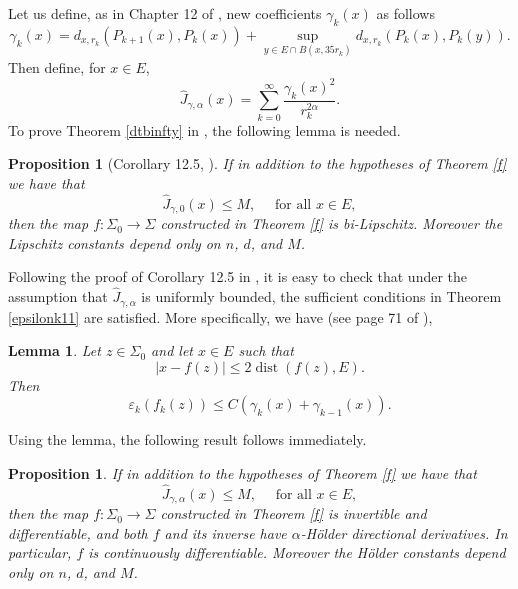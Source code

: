 \documentclass[11pt, twoside, leqno]{article}
\numberwithin{equation}{section}
\theoremstyle{plain}
\newtheorem{prop}[thm]{Proposition}
\newtheorem{lem}[thm]{Lemma}
\theoremstyle{definition}
\newcommand{\e}{\varepsilon} %
\newcommand{\dist}{\operatorname{dist}}
\begin{document}
Let us define, as in Chapter 12 of \cite{davidtoro}, new coefficients $\gamma_k(x)$ as follows
\begin{equation}
\gamma_k(x)=d_{x,r_k}(P_{k+1}(x),P_k(x)) + \sup_{y \in E \cap B(x,35r_k)}d_{x,r_k}(P_k(x), P_k(y)).
\end{equation}
Then define, for $x \in E$, 
\begin{equation}
\hat{J}_{\gamma,\alpha}(x)=\sum_{k=0}^{\infty}\frac{\gamma_k(x)^2}{r_k^{2\alpha}}.
\end{equation}
To prove Theorem \ref{dtbinfty} in \cite{davidtoro}, the following lemma is needed. 
\begin{prop} [Corollary 12.5, \cite{davidtoro}]
If in addition to the hypotheses of Theorem \ref{f} we have that 
\begin{equation}
\hat{J}_{\gamma,0}(x) \leq M, \quad \text{ for all $x \in E$},
\end{equation}
then the map $f \colon \Sigma_0 \to \Sigma$ constructed in Theorem \ref{f} is bi-Lipschitz. Moreover the Lipschitz constants depend only on $n$, $d$, and $M$.
\end{prop}
Following the proof of Corollary 12.5 in \cite{davidtoro}, it is easy to check that under the assumption that $\hat{J}_{\gamma,\alpha}$ is uniformly bounded, the sufficient conditions in Theorem \ref{epsilonk11} are satisfied.
More specifically, we have (see page 71 of \cite{davidtoro}),
\begin{lem}
Let $z \in \Sigma_0$ and let $x \in E$ such that
\begin{equation}
    |x-f(z)| \leq 2 \dist(f(z),E).
\end{equation}
Then 
\begin{equation}
    \e_k(f_k(z)) \leq C (\gamma_k(x)+\gamma_{k-1}(x)).
\end{equation}
\end{lem}
Using the lemma, the following result follows immediately.
\begin{prop}
If in addition to the hypotheses of Theorem \ref{f} we have that 
\begin{equation}
\hat{J}_{\gamma,\alpha}(x) \leq M, \quad \text{ for all $x \in E$},
\end{equation}
then the map $f \colon \Sigma_0 \to \Sigma$ constructed in Theorem \ref{f} is invertible and differentiable, and both $f$ and its inverse have $ \alpha$-H\"{o}lder directional derivatives. In particular, $f$ is continuously differentiable. Moreover the H\"{o}lder constants depend only on $n$, $d$, and $M$.
\end{prop}
\end{document}
